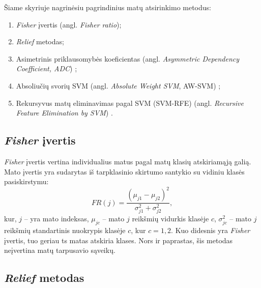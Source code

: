 Šiame skyriuje nagrinėsiu pagrindinius matų atsirinkimo metodus:
\begin{enumerate}
 \item \textit{Fisher} įvertis (angl. \textit{Fisher ratio})\cite{Pavlidis:2001:GFC:369133.369228};
 \item \textit{Relief} metodas\cite{DBLP:journals/ml/Robnik-SikonjaK03};
 \item Asimetrinis priklausomybės koeficientas (angl. \textit{Asymmetric Dependency Coefficient, ADC}) \cite{Shannon:2001:MTC:584091.584093};
 \item Absoliučių svorių SVM (angl. \textit{Absolute Weight SVM}, AW-SVM) \cite{vapnik2000nature};
 \item Rekursyvus matų eliminavimas pagal SVM (SVM-RFE) (angl. \textit{Recursive Feature Elimination by SVM}) \cite{Guyon:2002:GSC:599613.599671}.
\end{enumerate}

\subsection{\textit{Fisher} įvertis}

\textit{Fisher} įvertis vertina individualius matus pagal matų klasių atskiriamąją galią. Mato įvertis yra sudarytas iš tarpklasinio skirtumo santykio su vidiniu klasės pasiskirstymu:
\begin{equation}
 FR(j) = \frac{(\mu_{j1} - \mu_{j2})^2}{\sigma_{j1}^2 + \sigma_{j2}^2},
\end{equation}
kur, 
$j$ -- yra mato indeksas, 
$\mu_{jc}$ -- mato $j$ reikšmių vidurkis klasėje $c$, 
$\sigma_{jc}^2$ -- mato $j$ reikšmių standartinis nuokrypis klasėje $c$, kur $c={1,2}$. Kuo didesnis yra \textit{Fisher} įvertis, tuo geriau ts matas atskiria klases. Nors ir paprastas, šis metodas neįvertina matų tarpusavio sąveikų.

\subsection{\textit{Relief} metodas}

